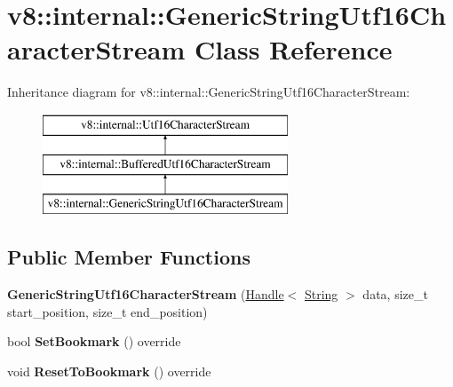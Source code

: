\hypertarget{classv8_1_1internal_1_1_generic_string_utf16_character_stream}{}\section{v8\+:\+:internal\+:\+:Generic\+String\+Utf16\+Character\+Stream Class Reference}
\label{classv8_1_1internal_1_1_generic_string_utf16_character_stream}
Inheritance diagram for v8\+:\+:internal\+:\+:Generic\+String\+Utf16\+Character\+Stream\+:\begin{figure}[H]
\begin{center}
\leavevmode
\includegraphics[height=3.000000cm]{classv8_1_1internal_1_1_generic_string_utf16_character_stream}
\end{center}
\end{figure}
\subsection*{Public Member Functions}
\begin{DoxyCompactItemize}
\item 
{\bfseries Generic\+String\+Utf16\+Character\+Stream} (\hyperlink{classv8_1_1internal_1_1_handle}{Handle}$<$ \hyperlink{classv8_1_1internal_1_1_string}{String} $>$ data, size\+\_\+t start\+\_\+position, size\+\_\+t end\+\_\+position)\hypertarget{classv8_1_1internal_1_1_generic_string_utf16_character_stream_a502981c0640f2876f33f5876017ef2c0}{}\label{classv8_1_1internal_1_1_generic_string_utf16_character_stream_a502981c0640f2876f33f5876017ef2c0}

\item 
bool {\bfseries Set\+Bookmark} () override\hypertarget{classv8_1_1internal_1_1_generic_string_utf16_character_stream_afb56ed60b9b114f0fc7fa8c3cb3be598}{}\label{classv8_1_1internal_1_1_generic_string_utf16_character_stream_afb56ed60b9b114f0fc7fa8c3cb3be598}

\item 
void {\bfseries Reset\+To\+Bookmark} () override\hypertarget{classv8_1_1internal_1_1_generic_string_utf16_character_stream_a156989361cc340fb541cbfd9026005c7}{}\label{classv8_1_1internal_1_1_generic_string_utf16_character_stream_a156989361cc340fb541cbfd9026005c7}

\end{DoxyCompactItemize}

